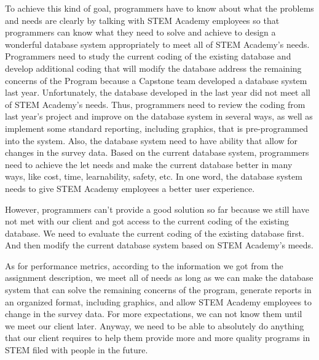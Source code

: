 \documentclass[letterpaper,10pt,draftclsnofoot,onecolumn]{IEEEtran}
\begin{document}
To achieve this kind of goal, programmers have to know about what the problems and needs are clearly by talking with STEM Academy employees so that programmers can know what they need to solve and achieve to design a wonderful database system appropriately to meet all of STEM Academy\rq s needs. Programmers need to study the current coding of the existing database and develop additional coding that will modify the database address the remaining concerns of the Program because a Capstone team developed a database system last year. Unfortunately, the database developed in the last year did not meet all of STEM Academy\rq s needs. Thus, programmers need to review the coding from last year\rq s project and improve on the database system in several ways, as well as implement some standard reporting, including graphics, that is pre-programmed into the system. Also, the database system need to have ability that allow for changes in the survey data. Based on the current database system, programmers need to achieve the let needs and make the current database better in many ways, like cost, time, learnability, safety, etc. In one word, the database system needs to give STEM Academy employees a better user experience. 

However, programmers can\rq t provide a good solution so far because we still have not met with our client and got access to the current coding of the existing database. We need to evaluate the current coding of the existing database first. And then modify the current database system based on STEM Academy\rq s meeds. 

As for performance metrics, according to the information we got from the assignment description, we meet all of needs as long as we can make the database system that can solve the remaining concerns of the program, generate reports in an organized format, including graphics, and allow STEM Academy employees to change in the survey data. For more expectations, we can not know them until we meet our client later. Anyway, we need to be able to absolutely do anything that our client requires to help them provide more and more quality programs in STEM filed with people in the future. 
\end{document}

